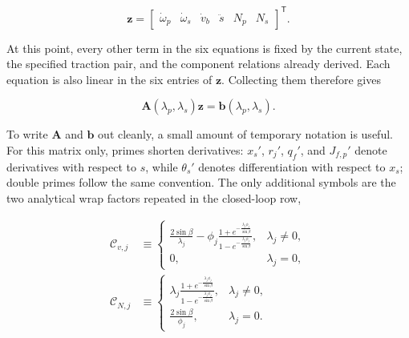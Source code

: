\documentclass[11pt]{report}
\numberwithin{equation}{section}
\begin{document}
\begin{equation}
    \mathbf z
    =
    \begin{bmatrix}
        \dot\omega_p &
        \dot\omega_s &
        \dot v_b &
        \ddot s &
        N_p &
        N_s
    \end{bmatrix}^{\mathsf T}.
\label{eq:engaged_linear_unknowns}
\end{equation}

At this point, every other term in the six equations is fixed by the current
state, the specified traction pair, and the component relations already
derived. Each equation is also linear in the six entries of \(\mathbf z\).
Collecting them therefore gives

\begin{equation}
    \mathbf A(\lambda_p,\lambda_s)\mathbf z
    =
    \mathbf b(\lambda_p,\lambda_s).
\label{eq:engaged_six_by_six_mechanical_core}
\end{equation}

To write \(\mathbf A\) and \(\mathbf b\) out cleanly, a small amount of
temporary notation is useful. For this matrix only, primes shorten
derivatives: \(x_s'\), \(r_j'\), \(q_f'\), and \(J_{f,p}'\) denote
derivatives with respect to \(s\), while \(\theta_s'\) denotes
differentiation with respect to \(x_s\); double primes follow the same
convention. The only additional symbols are the two analytical wrap factors
repeated in the closed-loop row,

\begin{equation}
\begin{aligned}
    \mathcal C_{v,j}
    &\equiv
    \begin{cases}
        \displaystyle
        \frac{2\sin\beta}{\lambda_j}
        -
        \phi_j
        \frac{
            1+e^{-\frac{\lambda_j\phi_j}{\sin\beta}}
        }{
            1-e^{-\frac{\lambda_j\phi_j}{\sin\beta}}
        },
        & \lambda_j\neq0,
        \\[8pt]
        0,
        & \lambda_j=0,
    \end{cases}
    \\[8pt]
    \mathcal C_{N,j}
    &\equiv
    \begin{cases}
        \displaystyle
        \lambda_j
        \frac{
            1+e^{-\frac{\lambda_j\phi_j}{\sin\beta}}
        }{
            1-e^{-\frac{\lambda_j\phi_j}{\sin\beta}}
        },
        & \lambda_j\neq0,
        \\[8pt]
        \displaystyle
        \frac{2\sin\beta}{\phi_j},
        & \lambda_j=0.
    \end{cases}
\end{aligned}
\label{eq:engaged_wrap_matrix_coefficients}
\end{equation}
\end{document}
